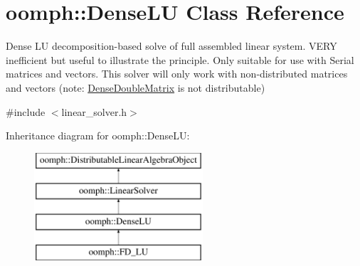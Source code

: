 \hypertarget{classoomph_1_1DenseLU}{}\section{oomph\+:\+:Dense\+LU Class Reference}
\label{classoomph_1_1DenseLU}


Dense LU decomposition-\/based solve of full assembled linear system. V\+E\+RY inefficient but useful to illustrate the principle. Only suitable for use with Serial matrices and vectors. This solver will only work with non-\/distributed matrices and vectors (note\+: \hyperlink{classoomph_1_1DenseDoubleMatrix}{Dense\+Double\+Matrix} is not distributable)  




{\ttfamily \#include $<$linear\+\_\+solver.\+h$>$}

Inheritance diagram for oomph\+:\+:Dense\+LU\+:\begin{figure}[H]
\begin{center}
\leavevmode
\includegraphics[height=4.000000cm]{classoomph_1_1DenseLU}
\end{center}
\end{figure}
